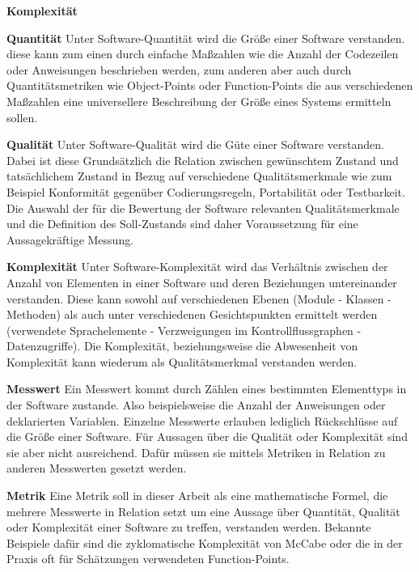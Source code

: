 \documentclass[gb,ngerman]{stthesis}
\begin{document}
  		\begin{labeling}{\textbf{Komplexität}}
  		\item [\textbf{Quantität}] Unter Software-Quantität wird die Größe einer Software verstanden. diese kann zum einen durch einfache Maßzahlen wie die Anzahl der Codezeilen oder Anweisungen beschrieben werden, zum anderen aber auch durch Quantitätsmetriken wie Object-Points oder Function-Points die aus verschiedenen Maßzahlen eine universellere Beschreibung der Größe eines Systems ermitteln sollen.
  		\item [\textbf{Qualität}] Unter Software-Qualität wird die Güte einer Software verstanden. Dabei ist diese Grundsätzlich die Relation zwischen gewünschtem Zustand und tatsächlichem Zustand in Bezug auf verschiedene Qualitätsmerkmale wie zum Beispiel Konformität gegenüber Codierungsregeln, Portabilität oder Testbarkeit. Die Auswahl der für die Bewertung der Software relevanten Qualitätsmerkmale und die Definition des Soll-Zustands sind daher Voraussetzung für eine Aussagekräftige Messung. \newpage
  		\item [\textbf{Komplexität}] Unter Software-Komplexität wird das Verhältnis zwischen der Anzahl von Elementen in einer Software und deren Beziehungen untereinander verstanden. Diese kann sowohl auf verschiedenen Ebenen (Module - Klassen - Methoden) als auch unter verschiedenen Gesichtspunkten ermittelt werden (verwendete Sprachelemente - Verzweigungen im Kontrollflussgraphen - Datenzugriffe). Die Komplexität, beziehungsweise die Abwesenheit von Komplexität kann wiederum als Qualitätsmerkmal verstanden werden.
  		\item [\textbf{Messwert}] Ein Messwert kommt durch Zählen eines bestimmten Elementtyps in der Software zustande. Also beispielsweise die Anzahl der Anweisungen oder deklarierten Variablen. Einzelne Messwerte erlauben lediglich Rückschlüsse auf die Größe einer Software. Für Aussagen über die Qualität oder Komplexität sind sie aber nicht ausreichend. Dafür müssen sie mittels Metriken in Relation zu anderen Messwerten gesetzt werden.
  		\item [\textbf{Metrik}] Eine Metrik soll in dieser Arbeit als eine mathematische Formel, die mehrere Messwerte in Relation setzt um eine Aussage über Quantität, Qualität oder Komplexität einer Software zu treffen, verstanden werden. Bekannte Beispiele dafür sind die zyklomatische Komplexität von McCabe oder die in der Praxis oft für Schätzungen verwendeten Function-Points.
  		\end{labeling}
    
\end{document}
